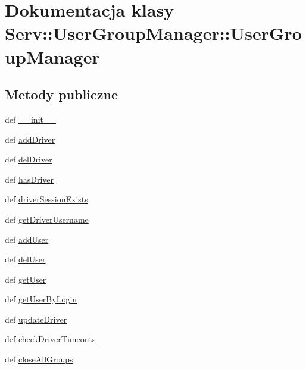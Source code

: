 \hypertarget{class_serv_1_1_user_group_manager_1_1_user_group_manager}{
\section{Dokumentacja klasy Serv::UserGroupManager::UserGroupManager}
\label{class_serv_1_1_user_group_manager_1_1_user_group_manager}
}
\subsection*{Metody publiczne}
\begin{CompactItemize}
\item 
def \hyperlink{class_serv_1_1_user_group_manager_1_1_user_group_manager_f43f9798f1e93dd8425699ecd6de6c87}{\_\-\_\-init\_\-\_\-}
\item 
def \hyperlink{class_serv_1_1_user_group_manager_1_1_user_group_manager_ea0f7f8d1d6e4d5efce31f3d0ea35fd9}{addDriver}
\item 
def \hyperlink{class_serv_1_1_user_group_manager_1_1_user_group_manager_918bada5214630320d1650bef41f4889}{delDriver}
\item 
def \hyperlink{class_serv_1_1_user_group_manager_1_1_user_group_manager_39ae7245da0bcda25ce712d1b55f2f29}{hasDriver}
\item 
def \hyperlink{class_serv_1_1_user_group_manager_1_1_user_group_manager_2911282f4333a88387427c1563649a52}{driverSessionExists}
\item 
def \hyperlink{class_serv_1_1_user_group_manager_1_1_user_group_manager_7429d0df435f9c1e758d59aa250b4d76}{getDriverUsername}
\item 
def \hyperlink{class_serv_1_1_user_group_manager_1_1_user_group_manager_46ee225566738a93c7c036b464a931fb}{addUser}
\item 
def \hyperlink{class_serv_1_1_user_group_manager_1_1_user_group_manager_4b747272c8166d17b9458b3f8c4796f0}{delUser}
\item 
def \hyperlink{class_serv_1_1_user_group_manager_1_1_user_group_manager_94bccb5702d504f5b782ba2379aaaab4}{getUser}
\item 
def \hyperlink{class_serv_1_1_user_group_manager_1_1_user_group_manager_ed20d08470748f78a641e6cc5700b505}{getUserByLogin}
\item 
def \hyperlink{class_serv_1_1_user_group_manager_1_1_user_group_manager_4b8ea748cedc09e0613b3ee7b2674d1a}{updateDriver}
\item 
def \hyperlink{class_serv_1_1_user_group_manager_1_1_user_group_manager_d856b62d77f4d4de9f710c973e0684ff}{checkDriverTimeouts}
\item 
def \hyperlink{class_serv_1_1_user_group_manager_1_1_user_group_manager_27d3337033ac8ff991c966de020f44bc}{closeAllGroups}
\end{CompactItemize}
